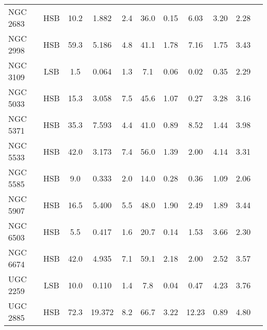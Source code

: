 \documentclass[preprint,aps]{revtex4}
\begin{document}
\begin{table}
\begin{tabular}{l c c c c c c c c c c}
\\
NGC 2683 &HSB& 10.2 &   \phantom{0}1.882   & 2.4 & 36.0 &0.15 & \phantom{0}6.03 & 3.20
& 2.28 & \cite{Casertano1991} \cite{Casertano1991} \cite{Kent1985} \cite{Sanders1996}
\\
NGC 2998 &HSB& 59.3&   \phantom{0}5.186   &4.8 & 41.1 & 1.78 & \phantom{0}7.16 & 1.75
& 3.43  & \cite{Broeils1992}  \cite{Broeils1992}  \cite{Kent1986}  \cite{Broeils1992}
\\
NGC 3109 & LSB &\phantom{0}1.5 &  \phantom{0}0.064    & 1.3 & \phantom{0}7.1 & 0.06 &
\phantom{0}0.02 &0.35 & 2.29& \cite{Jobin1990}  \cite{Carignan1985b}  \cite{Carignan1985b} \cite{Jobin1990}
\\
NGC 5033 & HSB & 15.3&   \phantom{0}3.058   & 7.5 & 45.6& 1.07 & \phantom{0}0.27 &
3.28 & 3.16 & \cite{Begeman1987}  \cite{Begeman1987}  \cite{Wevers1986} \cite{Begeman1987}
\\
NGC 5371 &HSB& 35.3 &   \phantom{0}7.593   & 4.4 & 41.0 & 0.89 & \phantom{0}8.52 & 1.44 & 3.98 & \cite{Begeman1987} \cite{Begeman1987} \cite{Wevers1986} \cite{Begeman1987}
\\
NGC 5533 &HSB& 42.0 &  \phantom{0}3.173    & 7.4 & 56.0 & 1.39 & \phantom{0}2.00 &4.14  &3.31 & \cite{Broeils1992} \cite{Broeils1992}  \cite{Kent1985}  \cite{Broeils1992}
\\
NGC 5585 & HSB &\phantom{0}9.0 &   \phantom{0}0.333   & 2.0 & 14.0 & 0.28 &
\phantom{0}0.36 & 1.09 & 2.06 & \cite{Cote1991} \cite{Cote1991} \cite{Cote1991} \cite{Cote1991}
\\
NGC 5907 & HSB & 16.5      &  \phantom{0}5.400&5.5 & 48.0 & 1.90 &\phantom{0}2.49 &1.89 & 3.44& \cite{Barnaby1994} \cite{Sanders1996} \cite{Barnaby1994} \cite{Sanders1996}
\\
NGC 6503 & HSB&\phantom{0}5.5 &  \phantom{0}0.417   & 1.6 & 20.7 & 0.14 &
\phantom{0}1.53 & 3.66 & 2.30 & \cite{Begeman1987} \cite{Begeman1987} \cite{Wevers1986} \cite{Begeman1987}
\\
NGC 6674 & HSB & 42.0 &   \phantom{0}4.935   &7.1 & 59.1 & 2.18 & \phantom{0}2.00
&2.52 & 3.57 & \cite{Broeils1992} \cite{Broeils1992}  \cite{Broeils1991}  \cite{Broeils1992}
\\
UGC 2259 &LSB& 10.0 &   \phantom{0}0.110   & 1.4 & \phantom{0}7.8 &0.04 &
\phantom{0}0.47 & 4.23 & 3.76 & \cite{Carignan1988} \cite{Carignan1988} \cite{Kent1987a} \cite{Carignan1988}
\\
UGC 2885 &HSB& 72.3 &   19.372   & 8.2 & 66.7 &3.22 &12.23 & 0.89 & 4.80& \cite{Roelfsema1985} \cite{Kent1986} \cite{Kim2007} \cite{Sanders1996}
\\
\hline 
\end{tabular}
\label{table:Misc} 
\end{table}
\end{document}

